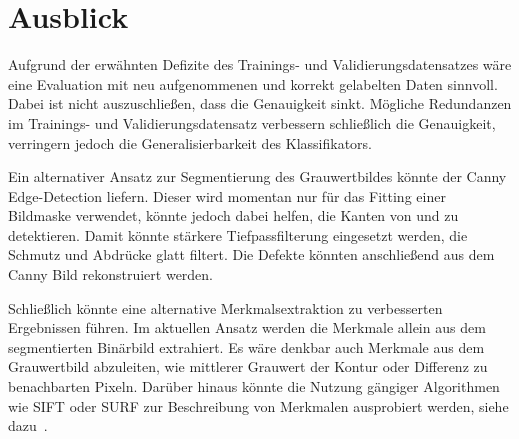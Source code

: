 \chapter{Ausblick}

Aufgrund der erwähnten Defizite des Trainings- und Validierungsdatensatzes wäre eine Evaluation mit neu aufgenommenen und korrekt gelabelten Daten sinnvoll. Dabei ist nicht auszuschließen, dass die Genauigkeit sinkt. Mögliche Redundanzen im Trainings- und Validierungsdatensatz verbessern schließlich die Genauigkeit, verringern jedoch die Generalisierbarkeit des Klassifikators.

Ein alternativer Ansatz zur Segmentierung des Grauwertbildes könnte der \foreignlanguage{english}{Canny Edge-Detection} liefern. Dieser wird momentan nur für das Fitting einer Bildmaske verwendet, könnte jedoch dabei helfen, die Kanten von  und  zu detektieren. Damit könnte stärkere Tiefpassfilterung eingesetzt werden, die Schmutz und Abdrücke glatt filtert. Die Defekte könnten anschließend aus dem \foreignlanguage{english}{Canny} Bild rekonstruiert werden.

Schließlich könnte eine alternative Merkmalsextraktion zu verbesserten Ergebnissen führen. Im aktuellen Ansatz werden die Merkmale allein aus dem segmentierten Binärbild extrahiert. Es wäre denkbar auch Merkmale aus dem Grauwertbild abzuleiten, wie mittlerer Grauwert der Kontur oder Differenz zu benachbarten Pixeln. Darüber hinaus könnte die Nutzung gängiger Algorithmen wie SIFT oder SURF zur Beschreibung von Merkmalen ausprobiert werden, siehe dazu~\cite{Deitsch2018}.
